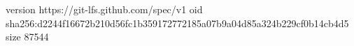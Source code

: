 version https://git-lfs.github.com/spec/v1
oid sha256:d2244f16672b210d56fc1b359172772185a07b9a04d85a324b229cf0b14cb4d5
size 87544
